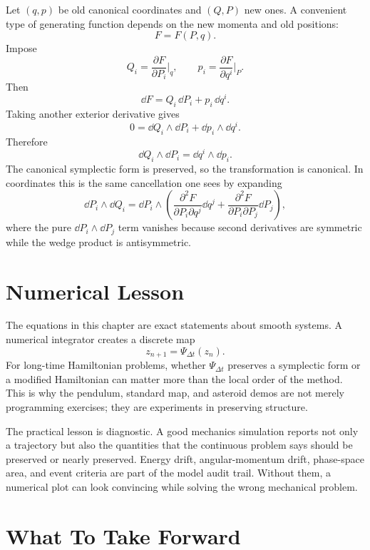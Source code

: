 \begin{derivation}
Let \((q,p)\) be old canonical coordinates and \((Q,P)\) new ones. A convenient
type of generating function depends on the new momenta and old positions:
\[
  F=F(P,q).
\]
Impose
\[
  Q_i=\frac{\partial F}{\partial P_i}\bigg|_q,
  \qquad
  p_i=\frac{\partial F}{\partial q^i}\bigg|_P.
\]
Then
\[
  \dd F=Q_i\,\dd P_i+p_i\,\dd q^i.
\]
Taking another exterior derivative gives
\[
  0=\dd Q_i\wedge\dd P_i+\dd p_i\wedge\dd q^i.
\]
Therefore
\[
  \dd Q_i\wedge\dd P_i
  =
  \dd q^i\wedge\dd p_i.
\]
The canonical symplectic form is preserved, so the transformation is canonical.
In coordinates this is the same cancellation one sees by expanding
\[
  \dd P_i\wedge\dd Q_i
  =
  \dd P_i\wedge
  \left(
    \frac{\partial^2F}{\partial P_i\partial q^j}\dd q^j
    +
    \frac{\partial^2F}{\partial P_i\partial P_j}\dd P_j
  \right),
\]
where the pure \(\dd P_i\wedge\dd P_j\) term vanishes because second
derivatives are symmetric while the wedge product is antisymmetric.
\end{derivation}

\section{Numerical Lesson}
\label{sec:numerical-lesson}

The equations in this chapter are exact statements about smooth systems. A
numerical integrator creates a discrete map
\[
  z_{n+1}=\Psi_{\Delta t}(z_n).
\]
For long-time Hamiltonian problems, whether \(\Psi_{\Delta t}\) preserves a
symplectic form or a modified Hamiltonian can matter more than the local order
of the method. This is why the pendulum, standard map, and asteroid demos are
not merely programming exercises; they are experiments in preserving structure.

The practical lesson is diagnostic. A good mechanics simulation reports not
only a trajectory but also the quantities that the continuous problem says
should be preserved or nearly preserved. Energy drift, angular-momentum drift,
phase-space area, and event criteria are part of the model audit trail. Without
them, a numerical plot can look convincing while solving the wrong mechanical
problem.

\section{What To Take Forward}
\label{sec:lag-ham-take-forward}

